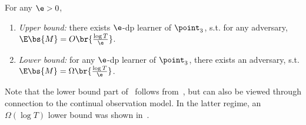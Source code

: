 


\begin{conjecture}\label{conj-puredp-ub-lb}
    For any \(\e > 0\),\begin{enumerate}
        \item \emph{Upper bound: } 
        there exists  \(\e\)-\Gls{dp} learner of \(\point_3\), s.t. for any adversary, \(\E \bs{M} = O\br{\frac{\log T}{\e}}\).
        \item \emph{Lower bound:} for any \(\e\)-\Gls{dp} learner of \(\point_3\), there exists an adversary, s.t. \(\E \bs{M} = \Omega\br{\frac{\log T}{\e}}\).
    \end{enumerate} 
\end{conjecture}

Note that the lower bound part of~ follows from~, but can also be viewed through connection to the continual observation model. In the latter regime, an \(\Omega(\log T)\) lower bound was shown in~\citet{dwork2014algorithmic}.

